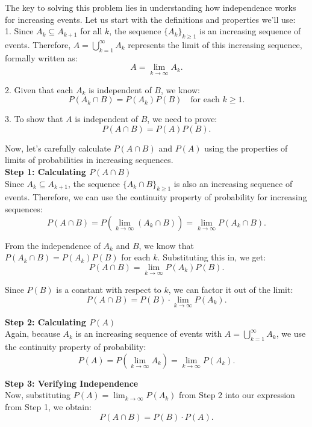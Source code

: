 \begin{solution}
    The key to solving this problem lies in understanding how independence works for increasing events. Let us start with the definitions and properties we'll use:\\

    1. Since \( A_k \subseteq A_{k+1} \) for all \( k \), the sequence \( \{A_k\}_{k \geq 1} \) is an increasing sequence of events. Therefore, \( A = \bigcup_{k=1}^{\infty} A_k \) represents the limit of this increasing sequence, formally written as:
       \[
       A = \lim_{k \to \infty} A_k.
       \]
    
    2. Given that each \( A_k \) is independent of \( B \), we know:
       \[
       P(A_k \cap B) = P(A_k) P(B) \quad \text{for each } k \geq 1.
       \]
    
    3. To show that \( A \) is independent of \( B \), we need to prove:
       \[
       P(A \cap B) = P(A) P(B).
       \]
    
    Now, let's carefully calculate \( P(A \cap B) \) and \( P(A) \) using the properties of limits of probabilities in increasing sequences.\\
    
    \textbf{Step 1: Calculating \( P(A \cap B) \)}\\
    
    Since \( A_k \subseteq A_{k+1} \), the sequence \( \{A_k \cap B\}_{k \geq 1} \) is also an increasing sequence of events. Therefore, we can use the continuity property of probability for increasing sequences:
    \[
    P(A \cap B) = P\left(\lim_{k \to \infty} (A_k \cap B)\right) = \lim_{k \to \infty} P(A_k \cap B).
    \]
    
    From the independence of \( A_k \) and \( B \), we know that \( P(A_k \cap B) = P(A_k) P(B) \) for each \( k \). Substituting this in, we get:
    \[
    P(A \cap B) = \lim_{k \to \infty} P(A_k) P(B).
    \]
    
    Since \( P(B) \) is a constant with respect to \( k \), we can factor it out of the limit:
    \[
    P(A \cap B) = P(B) \cdot \lim_{k \to \infty} P(A_k).
    \]
    
    \textbf{Step 2: Calculating \( P(A) \)}\\
    
    Again, because \( A_k \) is an increasing sequence of events with \( A = \bigcup_{k=1}^{\infty} A_k \), we use the continuity property of probability:
    \[
    P(A) = P\left(\lim_{k \to \infty} A_k\right) = \lim_{k \to \infty} P(A_k).
    \]
    
    \textbf{Step 3: Verifying Independence}\\
    
    Now, substituting \( P(A) = \lim_{k \to \infty} P(A_k) \) from Step 2 into our expression from Step 1, we obtain:
    \[
    P(A \cap B) = P(B) \cdot P(A).
    \]    
\end{solution}

